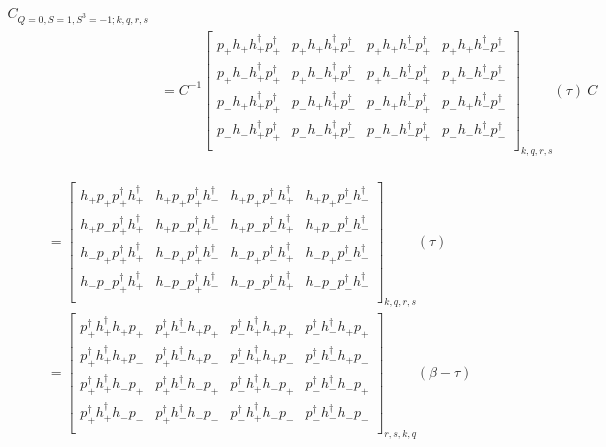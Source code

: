 \renewcommand{\cor}[4]{p_{#1}h_{#2}h^\dagger_{#3}p^\dagger_{#4}}
\renewcommand{\dcor}[4]{p_{#3}^\dagger h_{#4}^\dagger h_{#1} p_{#2}}

\begin{equation*}
  \begin{aligned}
    C_{Q=0,S=1,S^3=-1;k,q,r,s} \\
    &= C^{-1} \left[ 
    {\begin{array}{cccc}
      \cor{+}{+}{+}{+} & \cor{+}{+}{+}{-} & \cor{+}{+}{-}{+} & \cor{+}{+}{-}{-} \\
      \cor{+}{-}{+}{+} & \cor{+}{-}{+}{-} & \cor{+}{-}{-}{+} & \cor{+}{-}{-}{-} \\
      \cor{-}{+}{+}{+} & \cor{-}{+}{+}{-} & \cor{-}{+}{-}{+} & \cor{-}{+}{-}{-} \\
      \cor{-}{-}{+}{+} & \cor{-}{-}{+}{-} & \cor{-}{-}{-}{+} & \cor{-}{-}{-}{-} \\
    \end{array} } \right]_{k,q,r,s} (\tau)\:C \\
  \end{aligned}
\end{equation*}

\renewcommand{\cor}[4]{h_{#1}p_{#2}p^\dagger_{#3}h^\dagger_{#4}}

\begin{equation*}
  \begin{aligned}  
    &=\left[ {\begin{array}{cccc}
      \cor{+}{+}{+}{+} & \cor{+}{+}{+}{-} & \cor{+}{+}{-}{+} & \cor{+}{+}{-}{-} \\
      \cor{+}{-}{+}{+} & \cor{+}{-}{+}{-} & \cor{+}{-}{-}{+} & \cor{+}{-}{-}{-} \\
      \cor{-}{+}{+}{+} & \cor{-}{+}{+}{-} & \cor{-}{+}{-}{+} & \cor{-}{+}{-}{-} \\
      \cor{-}{-}{+}{+} & \cor{-}{-}{+}{-} & \cor{-}{-}{-}{+} & \cor{-}{-}{-}{-} \\
    \end{array} } \right]_{k,q,r,s} (\tau) \\
    &=\left[ 
    {\begin{array}{cccc}
      \dcor{+}{+}{+}{+} & \dcor{+}{+}{+}{-} & \dcor{+}{+}{-}{+} & \dcor{+}{+}{-}{-} \\
      \dcor{+}{-}{+}{+} & \dcor{+}{-}{+}{-} & \dcor{+}{-}{-}{+} & \dcor{+}{-}{-}{-} \\
      \dcor{-}{+}{+}{+} & \dcor{-}{+}{+}{-} & \dcor{-}{+}{-}{+} & \dcor{-}{+}{-}{-} \\
      \dcor{-}{-}{+}{+} & \dcor{-}{-}{+}{-} & \dcor{-}{-}{-}{+} & \dcor{-}{-}{-}{-} \\
    \end{array} } \right]_{r,s,k,q} (\beta-\tau) \\
  \end{aligned}
\end{equation*}

